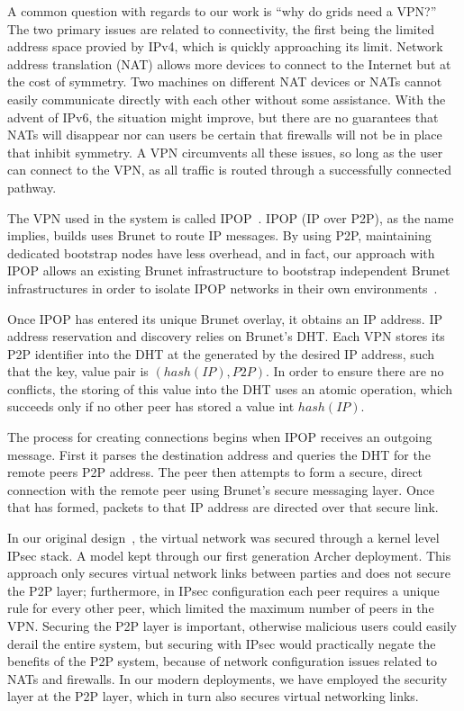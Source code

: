 \documentclass[conference]{IEEEtran}
\begin{document}
A common question with regards to our work is ``why do grids need a VPN?'' The
two primary issues are related to connectivity, the first being the limited
address space provied by IPv4, which is quickly approaching its limit.  Network
address translation (NAT) allows more devices to connect to the Internet but at
the cost of symmetry.  Two machines on different NAT devices or NATs cannot
easily communicate directly with each other without some assistance.  With the
advent of IPv6, the situation might improve, but there are no guarantees that
NATs will disappear nor can users be certain that firewalls will not be in
place that inhibit symmetry.  A VPN circumvents all these issues, so long as
the user can connect to the VPN, as all traffic is routed through a
successfully connected pathway.

The VPN used in the system is called IPOP~\cite{groupvpn, ipop}.  IPOP (IP over
P2P), as the name implies, builds uses Brunet to route IP messages.  By using
P2P, maintaining dedicated bootstrap nodes have less overhead, and in fact, our
approach with IPOP allows an existing Brunet infrastructure to bootstrap
independent Brunet infrastructures in order to isolate IPOP networks in their
own environments~\cite{virtual_private_overlays}.

Once IPOP has entered its unique Brunet overlay, it obtains an IP address.  IP
address reservation and discovery relies on Brunet's DHT.  Each VPN stores its
P2P identifier into the DHT at the generated by the desired IP address, such
that the key, value pair is $(hash(IP), P2P)$.  In order to ensure there are no
conflicts, the storing of this value into the DHT uses an atomic operation,
which succeeds only if no other peer has stored a value int $hash(IP)$.

The process for creating connections begins when IPOP receives an outgoing
message.  First it parses the destination address and queries the DHT for the
remote peers P2P address.  The peer then attempts to form a secure, direct
connection with the remote peer using Brunet's secure messaging layer.  Once
that has formed, packets to that IP address are directed over that secure link.

In our original design~\cite{vtdc06}, the virtual network was secured through a
kernel level IPsec stack.  A model kept through our first generation Archer
deployment.  This approach only secures virtual network links between parties
and does not secure the P2P layer; furthermore, in IPsec configuration each
peer requires a unique rule for every other peer, which limited the maximum
number of peers in the VPN.  Securing the P2P layer is important, otherwise
malicious users could easily derail the entire system, but securing with IPsec
would practically negate the benefits of the P2P system, because of network
configuration issues related to NATs and firewalls.  In our modern deployments,
we have employed the security layer at the P2P layer, which in turn also
secures virtual networking links.
\end{document}
